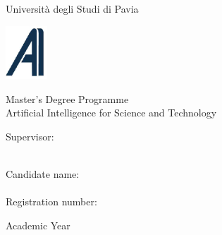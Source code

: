 \begin{titlepage}
\begin{center}
\begin{center}
\begin{minipage}[t]{4cm}
\begin{center}
\Large Universit\`a degli Studi di Pavia
\end{center}
\end{minipage}%
\end{center}%

\vskip 1.5cm

\begin{center}%
\begin{minipage}{2cm}%
\includegraphics[height=2cm]{logos/logo-ai4st}%
\end{minipage}%
\begin{minipage}{12cm}%
\begin{center}%
\LARGE%
Master's Degree Programme \\
Artificial Intelligence for Science and Technology
\end{center}%
\end{minipage}%
\end{center}%


\vskip 2.5cm

\Huge
	\textbf{\printtitle}

\vskip 2.5cm

\Large

\begin{minipage}[t]{7cm}
	Supervisor:\\
	\printsupervisor \\
\end{minipage}
\hfill
\begin{minipage}[t]{5cm}
	Candidate name:\\
	\printauthor\\
	Registration number:\\
    \regnumber
\end{minipage}

\vskip 1.5cm

	Academic Year \printacademicyear

\end{center}

\vfill
\eject
\end{titlepage}

